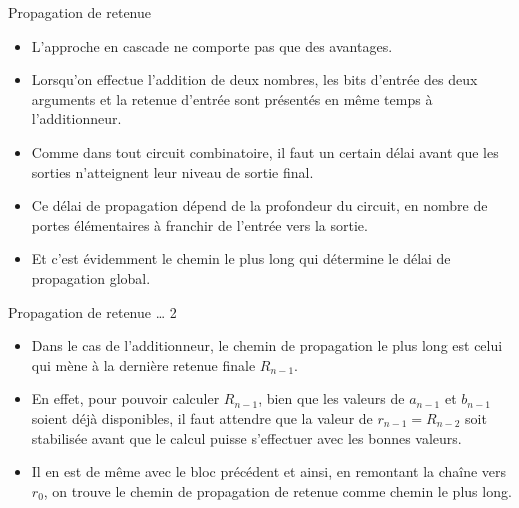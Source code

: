 \documentclass[presentation]{beamer}
\begin{document}
\begin{frame}[label={sec:org93db6de}]{Propagation de retenue}
\begin{itemize}
\item L'approche en cascade ne comporte pas que des avantages.

\item Lorsqu'on effectue l'addition de deux nombres, les bits d'entrée des deux arguments et la retenue d'entrée sont présentés en même temps à l'additionneur.

\item Comme dans tout circuit combinatoire, il faut un certain délai avant que les sorties n'atteignent leur niveau de sortie final.

\item Ce délai de propagation dépend de la profondeur du circuit, en nombre de portes élémentaires à franchir de l'entrée vers la sortie.

\item Et c'est évidemment le chemin le plus long qui détermine le délai de propagation global.
\end{itemize}
\end{frame}

\begin{frame}[label={sec:org922f7d5}]{Propagation de retenue \ldots{} 2}
\begin{itemize}
\item Dans le cas de l'additionneur, le chemin de propagation le plus long est celui qui mène à la dernière retenue finale \(R_{n-1}\).

\item En effet, pour pouvoir calculer \(R_{n-1}\), bien que les valeurs de \(a_{n-1}\) et \(b_{n-1}\) soient déjà disponibles, il faut attendre que la valeur de \(r_{n-1} = R_{n-2}\) soit stabilisée avant que le calcul puisse s'effectuer avec les bonnes valeurs.

\item Il en est de même avec le bloc précédent et ainsi, en remontant la chaîne vers \(r_0\), on trouve le chemin de propagation de retenue comme chemin le plus long.
\end{itemize}
\end{frame}
\end{document}
